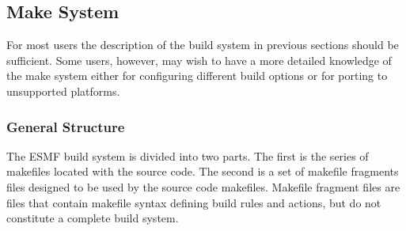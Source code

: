 

\subsection{Make System}
\label{sec:make}
For most users the description of the build system in previous
sections should be sufficient.  Some users, however, may wish to have
a more detailed knowledge of the make system either for configuring
different build options or for porting to unsupported platforms.
\subsubsection{General Structure}

The ESMF build system is divided into two parts.  The first is the
series of makefiles located with the source code.  The second is a set
of makefile fragments files designed to be used by the source code
makefiles.  Makefile fragment files are files that contain makefile
syntax defining build rules and actions, but do not constitute a
complete build system.

